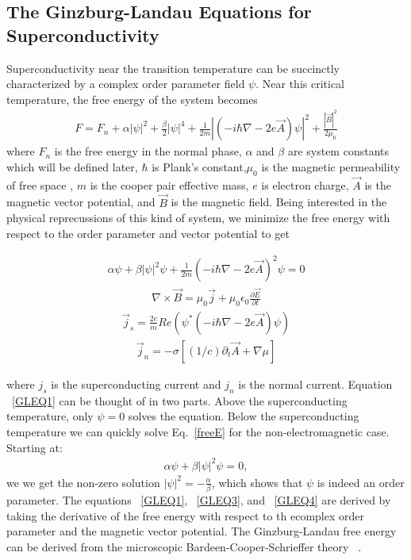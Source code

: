 \subsection{The Ginzburg-Landau Equations for Superconductivity}
Superconductivity near the transition temperature can be succinctly characterized by a complex order parameter field $\psi$. Near this critical temperature, the free energy of the system becomes
\begin{eqnarray}
F = F_n + \alpha |\psi|^2 + \frac {\beta} {2} |\psi|^4 + \frac {1} {2m} |(-i \hbar \nabla - 2 e \overrightarrow A) \psi|^2 + \frac {|\overrightarrow B |^2} {2 \mu_0}
\label{freeE}
\end{eqnarray}
where $F_n$ is the free energy in the normal phase, $\alpha$ and $\beta$ are system constants which will be defined later, $\hbar$ is Plank's constant,$\mu_0$ is the magnetic permeability of free space , $m$ is the cooper pair effective mass, $e$ is electron charge, $\overrightarrow A$ is the magnetic vector potential, and $\overrightarrow B$ is the magnetic field. Being interested in the physical reprecussions of this kind of system, we minimize the free energy with respect to the order parameter and vector potential to get

\begin{eqnarray}
\alpha \psi + \beta |\psi|^2 \psi + \frac {1} {2m} (-i \hbar \nabla - 2 e \overrightarrow A)^2 \psi = 0
\label{GLEQ1}
\end{eqnarray}
\begin{eqnarray}
\nabla \times \overrightarrow B = \mu_0 \overrightarrow j + \mu_0 \epsilon_0 \frac {\partial \overrightarrow E } {\partial t}
\label{GLEQ2}
\end{eqnarray}
\begin{eqnarray}
\overrightarrow j_s = \frac {2e} {m} Re(\psi^* (-i \hbar \nabla - 2 e \overrightarrow A) \psi)
\label{GLEQ3}
\end{eqnarray}
\begin{eqnarray}
\overrightarrow j_n = -\sigma [(1/c) \partial_t \overrightarrow A + \nabla \mu]
\label{GLEQ4}
\end{eqnarray}

where $j_s$ is the superconducting current and $j_n$ is the normal current. Equation ~\ref{GLEQ1} can be thought of in two parts. Above the superconducting temperature, only $\psi = 0$ solves the equation. Below the superconducting temperature we can quickly solve Eq.~\ref{freeE} for the non-electromagnetic case. Starting at:
\begin{eqnarray}
\alpha \psi + \beta |\psi|^2 \psi = 0 ,
\label{noEM}
\end{eqnarray}
we we get the non-zero solution $|\psi|^2 = -\frac {\alpha} {\beta}$, which shows that $\psi$ is indeed an order parameter. The equations ~\ref{GLEQ1}, ~\ref{GLEQ3}, and ~\ref{GLEQ4} are derived by taking the derivative of the free energy with respect to th ecomplex order parameter and the magnetic vector potential. The Ginzburg-Landau free energy can be derived from the microscopic Bardeen-Cooper-Schrieffer theory ~\cite{Sadovskyy14}. 

